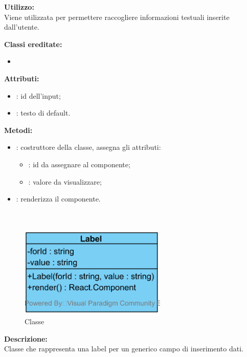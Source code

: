 \textbf{Utilizzo:}\\
Viene utilizzata per permettere raccogliere informazioni testuali inserite dall'utente.

\textbf{Classi ereditate:}
\begin{itemize}
	\item {}
\end{itemize}


\textbf{Attributi:}
\begin{itemize}
	\item {}: id dell'input;
	\item {}: testo di default.
\end{itemize}

\textbf{Metodi:}
\begin{itemize}
	\item {}: costruttore della classe, assegna gli attributi:
	\begin{itemize}
		\item {}: id da assegnare al componente;
		\item {}: valore da visualizzare;
	\end{itemize}
	\item {}: renderizza il componente.
\end{itemize}

\paragraph[::Label]{\class}\mbox{}\\ \label{\class}
\begin{figure}[H]
	\centering
	\includegraphics[width=7cm]{./diagrammi/framework/view/gui/label.png}
	\caption{Classe \class}
\end{figure}
\textbf{Descrizione:}\\
Classe che rappresenta una label per un generico campo di inserimento dati.

